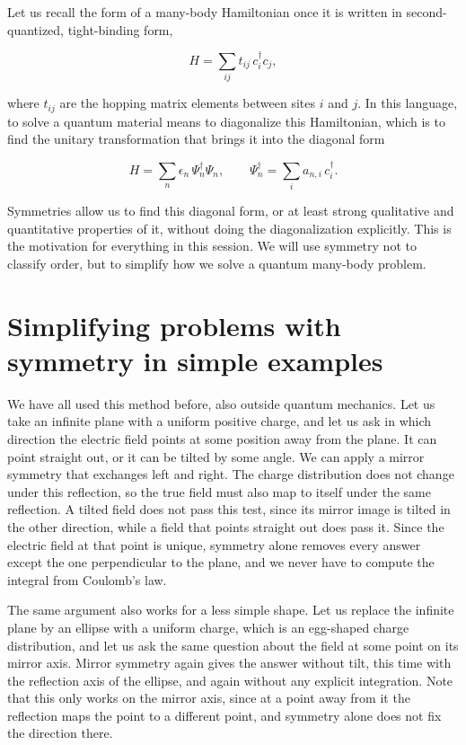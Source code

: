 Let us recall the form of a many-body Hamiltonian once it is written in second-quantized,
tight-binding form,

\begin{equation*}H = \sum_{ij} t_{ij}\, c_i^\dagger c_j,\end{equation*}

where $t_{ij}$ are the hopping matrix elements between sites $i$ and $j$. In this language, to solve
a quantum material means to diagonalize this Hamiltonian, which is to find the unitary transformation
that brings it into the diagonal form

\begin{equation*}H = \sum_n \epsilon_n\, \Psi_n^\dagger \Psi_n, \qquad \Psi_n^\dagger = \sum_i a_{n,i}\, c_i^\dagger.\end{equation*}

Symmetries allow us to find this diagonal form, or at least strong qualitative and quantitative
properties of it, without doing the diagonalization explicitly. This is the motivation for
everything in this session. We will use symmetry not to classify order, but to simplify how we solve
a quantum many-body problem.

\section{Simplifying problems with symmetry in simple examples}

We have all used this method before, also outside quantum mechanics. Let us take an infinite plane
with a uniform positive charge, and let us ask in which direction the electric field points at some
position away from the plane. It can point straight out, or it can be tilted by some angle. We can
apply a mirror symmetry that exchanges left and right. The charge distribution does not change under
this reflection, so the true field must also map to itself under the same reflection. A tilted field
does not pass this test, since its mirror image is tilted in the other direction, while a field that
points straight out does pass it. Since the electric field at that point is unique, symmetry alone
removes every answer except the one perpendicular to the plane, and we never have to compute the
integral from Coulomb's law.

The same argument also works for a less simple shape. Let us replace the infinite plane by an
ellipse with a uniform charge, which is an egg-shaped charge distribution, and let us ask the same
question about the field at some point on its mirror axis. Mirror symmetry again gives the answer
without tilt, this time with the reflection axis of the ellipse, and again without any explicit
integration. Note that this only works on the mirror axis, since at a point away from it the
reflection maps the point to a different point, and symmetry alone does not fix the direction there.

